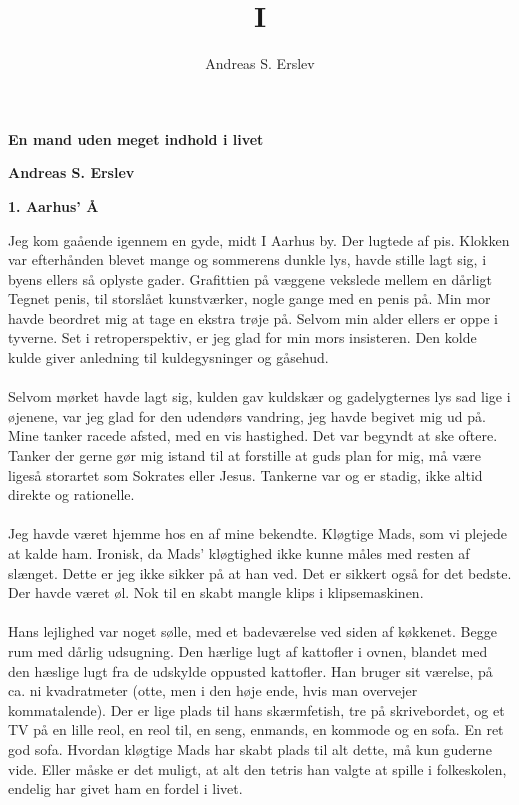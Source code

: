 \documentclass[]{article}
\title{I}
\author{Andreas S. Erslev}
\begin{document}
\begin{center}
	\Large\textbf{En mand uden meget indhold i livet}
\end{center}
\begin{center}
	\large\textbf{Andreas S. Erslev}
\end{center}

\begin{center}
	\large\textbf{1. Aarhus’ Å}
\end{center}

Jeg kom gaående igennem en gyde, midt I Aarhus by. Der lugtede af pis. Klokken var efterhånden blevet mange og sommerens dunkle lys, havde stille lagt sig, i byens ellers så oplyste gader. Grafittien på væggene vekslede mellem en dårligt Tegnet penis, til storslået kunstværker, nogle gange med en penis på. Min mor havde beordret mig at tage en ekstra trøje på. Selvom min alder ellers er oppe i tyverne. Set i retroperspektiv, er jeg glad for min mors insisteren. Den kolde kulde giver anledning til kuldegysninger og gåsehud.
\\ \\
Selvom mørket havde lagt sig, kulden gav kuldskær og gadelygternes lys sad lige i øjenene, var jeg glad for den udendørs vandring, jeg havde begivet mig ud på. Mine tanker racede afsted, med en vis hastighed. Det var begyndt at ske oftere. Tanker der gerne gør mig istand til at forstille at guds plan for mig, må være ligeså storartet som Sokrates eller Jesus. Tankerne var og er stadig, ikke altid direkte og rationelle.
\\ \\
Jeg havde været hjemme hos en af mine bekendte. Kløgtige Mads, som
vi plejede at kalde ham. Ironisk, da Mads’ kløgtighed ikke kunne måles med resten af slænget. Dette er jeg ikke sikker på at han ved. Det er sikkert også for det bedste. Der havde været øl. Nok til en skabt mangle klips i klipsemaskinen. 
\\ \\
Hans lejlighed var noget sølle, med et badeværelse ved siden af køkkenet. Begge rum med dårlig udsugning. Den hærlige lugt af kattofler i ovnen, blandet med den hæslige lugt fra de udskylde oppusted kattofler. Han bruger sit værelse, på ca. ni kvadratmeter (otte, men i den høje ende, hvis man overvejer kommatalende). Der er lige plads til hans skærmfetish, tre på skrivebordet, og et TV på en lille reol, en reol til, en seng, enmands, en kommode og en sofa. En ret god sofa. Hvordan kløgtige Mads har skabt plads til alt dette, må kun guderne vide. Eller måske er det muligt, at alt den tetris han valgte at spille i folkeskolen, endelig har givet ham en fordel i livet.
\end{document}
